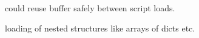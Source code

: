 
\begin{DoxyRefList}
\item[Global \mbox{\hyperlink{state_8c_a0c19f7ac884ab029c9933ffb0bd498fc}{load\+\_\+script}} (char $\ast$asset\+\_\+dir, char $\ast$fname)]\label{todo__todo000002}%
%
could reuse buffer safely between script loads. 

\label{todo__todo000003}%
%
loading of nested structures like arrays of dicts etc. 
\end{DoxyRefList}